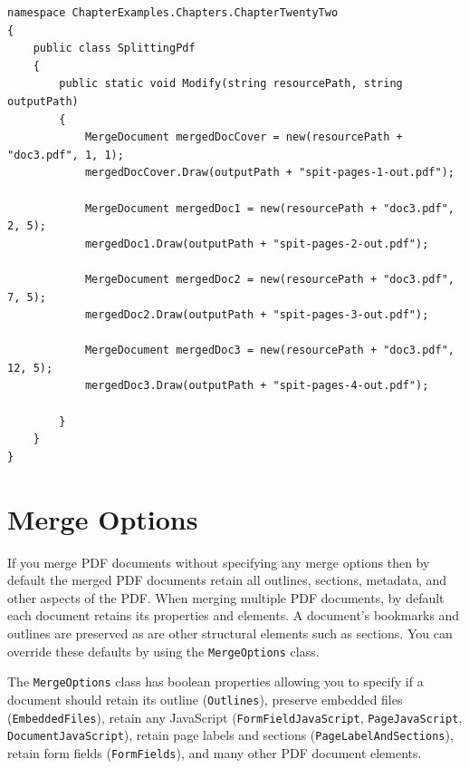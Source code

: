 \documentclass[american,letterpaper]{tufte-book}
\numberwithin{equation}{section}
\numberwithin{figure}{section}
\begin{document}
{{\begin{lstlisting}[caption={Splitting a PDF.},label={lis:Splitting-a-PDF.},basicstyle={\small\ttfamily},breaklines=true]
namespace ChapterExamples.Chapters.ChapterTwentyTwo
{
    public class SplittingPdf
    {
        public static void Modify(string resourcePath, string outputPath)
        {
            MergeDocument mergedDocCover = new(resourcePath + "doc3.pdf", 1, 1);
            mergedDocCover.Draw(outputPath + "spit-pages-1-out.pdf");
             
            MergeDocument mergedDoc1 = new(resourcePath + "doc3.pdf", 2, 5);
            mergedDoc1.Draw(outputPath + "spit-pages-2-out.pdf");

            MergeDocument mergedDoc2 = new(resourcePath + "doc3.pdf", 7, 5);
            mergedDoc2.Draw(outputPath + "spit-pages-3-out.pdf");

            MergeDocument mergedDoc3 = new(resourcePath + "doc3.pdf", 12, 5);
            mergedDoc3.Draw(outputPath + "spit-pages-4-out.pdf");

        }
    }
}
\end{lstlisting}
\leavevmode\egroup
\section{Merge Options}

If you merge PDF documents without specifying any merge options then
by default the merged PDF documents retain all outlines, sections,
metadata, and other aspects of the PDF. When merging multiple PDF
documents, by default each document retains its properties and elements.
A document's bookmarks and outlines are preserved as are other structural
elements such as sections. You can override these defaults by using
the \texttt{MergeOptions} class.

The \texttt{MergeOptions} class has boolean properties allowing you
to specify if a document should retain its outline (\texttt{Outlines}),
preserve embedded files (\texttt{EmbeddedFiles}), retain any JavaScript
(\texttt{FormFieldJavaScript}, \texttt{PageJavaScript}, \texttt{DocumentJavaScript}),
retain page labels and sections (\texttt{PageLabelAndSections}), retain
form fields (\texttt{FormFields}), and many other PDF document elements. 

}}
\end{document}

